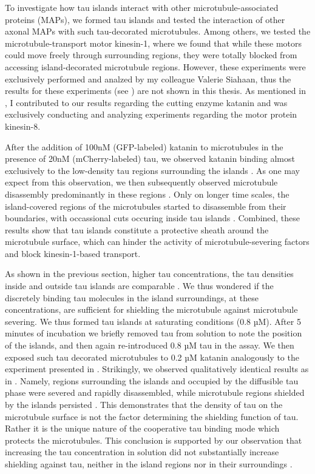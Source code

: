 To investigate how tau islands interact with other microtubule-associated proteins (MAPs), we formed tau islands and tested the interaction of other axonal MAPs with such tau-decorated microtubules. Among others, we tested the microtubule-transport motor kinesin-1, where we found that while these motors could move freely through surrounding regions, they were totally blocked from accessing island-decorated microtubule regions. However, these experiments were exclusively performed and analzed by my colleague Valerie Siahaan, thus the results for these experiments (see \cite{Siahaan2019a}) are not shown in this thesis. As mentioned in , I contributed to our results regarding the cutting enzyme katanin and was exclusively conducting and analyzing experiments regarding the motor protein kinesin-8.\par

After the addition of 100nM (GFP-labeled) katanin to microtubules in the presence of 20nM (mCherry-labeled) tau, we observed katanin binding almost exclusively to the low-density tau regions surrounding the islands . As one may expect from this observation, we then subsequently observed microtubule disassembly predominantly in these regions . Only on longer time scales, the island-covered regions of the microtubules started to disassemble from their boundaries, with occassional cuts occuring inside tau islands . Combined, these results show that tau islands constitute a protective sheath around the microtubule surface, which can hinder the activity of microtubule-severing factors and block kinesin-1-based transport. \par

As shown in the previous section, higher tau concentrations, the tau densities inside and outside tau islands are comparable . We thus wondered if the discretely binding tau molecules in the island surroundings, at these concentrations, are sufficient for shielding the microtubule against microtubule severing. We thus formed tau islands at saturating conditions (0.8 µM). After 5 minutes of incubation we briefly removed tau from solution to note the position of the islands, and then again re-introduced 0.8 µM tau in the assay. We then exposed such tau decorated microtubules to 0.2 µM katanin analogously to the experiment presented in . Strikingly, we observed qualitatively identical results as in . Namely, regions surrounding the islands and occupied by the diffusible tau phase were severed and rapidly disassembled, while microtubule regions shielded by the islands persisted . This demonstrates that the density of tau on the microtubule surface is not the factor determining the shielding function of tau. Rather it is the unique nature of the cooperative tau binding mode which protects the microtubules. This conclusion is supported by our observation that increasing the tau concentration in solution did not substantially increase shielding against tau, neither in the island regions  nor in their surroundings .\par

